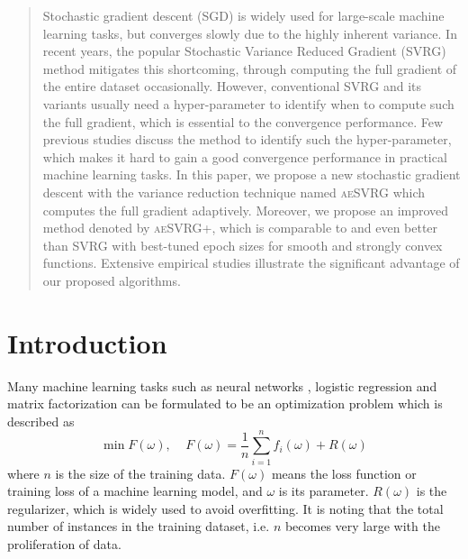 \documentclass[conference]{IEEEtran}
\begin{document}

\maketitle

\begin{abstract}
    Stochastic gradient descent (SGD) is widely used for large-scale machine learning tasks, but converges slowly due to the highly inherent variance. In recent years, the popular Stochastic Variance Reduced Gradient (SVRG) method mitigates this shortcoming, through computing the full gradient of the entire dataset occasionally. However, conventional SVRG and its variants usually need a hyper-parameter to identify when to compute such the full gradient, which is essential to the convergence performance. Few previous studies discuss the method to identify such the hyper-parameter, which makes it hard to gain a good convergence performance in practical machine learning tasks.  In this paper, we propose a new stochastic gradient descent with the variance reduction technique named \textsc{aeSVRG} which computes the full gradient adaptively.  Moreover, we propose an improved method denoted by \textsc{aeSVRG+}, which is comparable to and even better than SVRG with best-tuned epoch sizes for smooth and strongly convex functions. Extensive empirical studies illustrate the significant advantage of our proposed algorithms.


\end{abstract}


%
\IEEEpeerreviewmaketitle



\section{Introduction}
Many machine learning tasks such as neural networks \citep{Dean2012Large}, logistic regression \citep{Roux2012A} and matrix factorization \citep{Sa2015Global} can be formulated to be an optimization problem which is described as 
\begin{equation}
\label{equation_loss_minimization}
\min F(\omega),~~~~~F(\omega)=\frac{1}{n}\sum\limits_{i=1}^n f_i(\omega)+R(\omega)
\end{equation}
where $n$ is the size of the training data. $F(\omega)$ means the loss function or training loss of a machine learning model, and $\omega$ is its parameter. $R(\omega)$ is the regularizer, which is widely used to avoid overfitting. It is noting that the total number of instances in the training dataset, i.e. $n$ becomes very large with the proliferation of data. 
\end{document}
